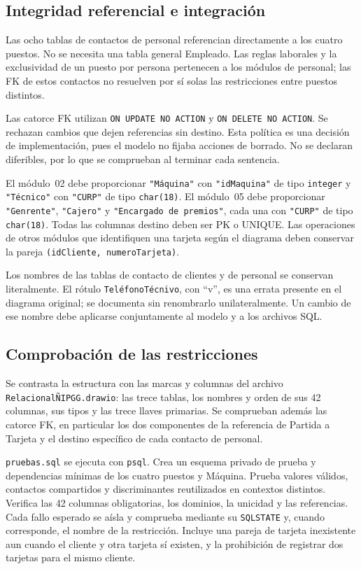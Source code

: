 \clearpage
\subsection{Integridad referencial e integración}

Las ocho tablas de contactos de personal referencian directamente a
los cuatro puestos. No se necesita una tabla general Empleado.
Las reglas laborales y la exclusividad de un puesto por persona
pertenecen a los módulos de personal; las FK de estos contactos no
resuelven por sí solas las restricciones entre puestos distintos.

Las catorce FK utilizan \texttt{ON UPDATE NO ACTION} y
\texttt{ON DELETE NO ACTION}. Se rechazan cambios que dejen referencias
sin destino. Esta política es una decisión de implementación, pues el
modelo no fijaba acciones de borrado. No se declaran diferibles, por
lo que se comprueban al terminar cada sentencia.

El módulo~02 debe proporcionar \texttt{"Máquina"} con
\texttt{"idMaquina"} de tipo \texttt{integer} y \texttt{"Técnico"}
con \texttt{"CURP"} de tipo \texttt{char(18)}. El módulo~05 debe
proporcionar \texttt{"Genrente"}, \texttt{"Cajero"} y
\texttt{"Encargado de premios"}, cada una con \texttt{"CURP"}
de tipo \texttt{char(18)}. Todas las columnas destino deben ser PK o
UNIQUE. Las operaciones de otros módulos que identifiquen una tarjeta
según el diagrama deben conservar la pareja
\texttt{(idCliente, numeroTarjeta)}.

Los nombres de las tablas de contacto de clientes y de personal se
conservan literalmente. El rótulo \texttt{TeléfonoTécnivo}, con ``v'',
es una errata presente en el diagrama original; se documenta sin
renombrarlo unilateralmente. Un cambio de ese nombre debe aplicarse
conjuntamente al modelo y a los archivos SQL.

\subsection{Comprobación de las restricciones}

Se contrasta la estructura con las marcas y columnas del archivo
\texttt{RelacionalÑIPGG.drawio}: las trece tablas, los nombres y orden
de sus 42 columnas, sus tipos y las trece llaves primarias. Se comprueban
además las catorce FK, en particular los dos componentes de la referencia
de Partida a Tarjeta y el destino específico de cada contacto de personal.

\texttt{pruebas.sql} se ejecuta con \texttt{psql}. Crea un esquema
privado de prueba y dependencias mínimas de los cuatro puestos y Máquina.
Prueba valores válidos, contactos compartidos y discriminantes
reutilizados en contextos distintos. Verifica las 42 columnas obligatorias,
los dominios, la unicidad y las referencias. Cada fallo esperado se aísla
y comprueba mediante su \texttt{SQLSTATE} y, cuando corresponde, el nombre
de la restricción. Incluye una pareja de tarjeta inexistente aun cuando
el cliente y otra tarjeta sí existen, y la prohibición de registrar dos
tarjetas para el mismo cliente.

